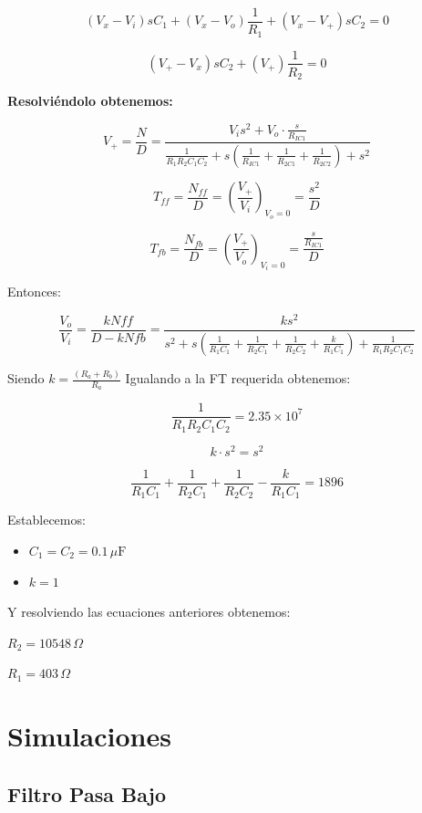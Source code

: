 \[
(V_x - V_i)sC_1 + (V_x - V_o)\frac{1}{R_1} + (V_x - V_+)sC_2 = 0
\]

\[
(V_+ - V_x)sC_2 + (V_+)\frac{1}{R_2} = 0
\]

\textbf{Resolviéndolo obtenemos:}

\[
V_+ = \frac{N}{D} = \frac{V_i s^2 + V_o \cdot \frac{s}{R_{IC1}}}{\frac{1}{R_1 R_2 C_1 C_2} + s \left(\frac{1}{R_{IC1}} + \frac{1}{R_{2C1}} + \frac{1}{R_{2C2}}\right) + s^2}
\]

\[
T_{ff} = \frac{N_{ff}}{D} = \left(\frac{V_+}{V_i}\right)_{V_o=0} = \frac{s^2}{D}
\]

\[
T_{fb} = \frac{N_{fb}}{D} = \left(\frac{V_+}{V_o}\right)_{V_i=0} = \frac{\frac{s}{R_{IC1}}}{D}
\]


\hspace{1mm} Entonces:

\[\frac{V_o}{V_i} = \frac{kNff}{D - kNfb} = \frac{k s^2}{s^2 + s \left( \frac{1}{R_1 C_1} + \frac{1}{R_2 C_1} + \frac{1}{R_2 C_2} + \frac{k}{R_1 C_1} \right) + \frac{1}{R_1 R_2 C_1 C_2}}\]


\hspace{1mm} Siendo \( k = \frac{(R_a + R_b)}{R_a} \) 
\bigskip
\newline
 Igualando a la FT requerida obtenemos:

\[
\frac{1}{R_{\text{1}} R_{\text{2}} C_1 C_2} = 2.35 \times 10^7
\]

\[
k \cdot s^2 = s^2
\]

\[
\frac{1}{R_1 C_1} + \frac{1}{R_2 C_1} + \frac{1}{R_2 C_2} - \frac{k}{R_1 C_1} = 1896
\]

\hspace {1mm}Establecemos:

\begin{itemize}
    \item \( C_1 = C_2 = 0.1 \, \mu \text{F} \)
    \item \( k = 1 \)
\end{itemize}

\hspace{1mm}Y resolviendo las ecuaciones anteriores obtenemos:

\( R_2 = 10548 \, \Omega \)

\( R_1 = 403 \, \Omega \)

\newpage

\section{Simulaciones}

\subsection{Filtro Pasa Bajo}

